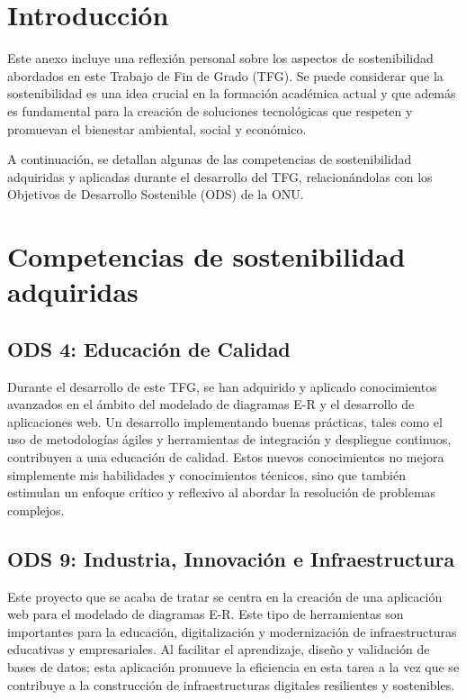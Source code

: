 
\section{Introducción}
Este anexo incluye una reflexión personal sobre los aspectos de sostenibilidad abordados en este Trabajo de Fin de Grado (TFG). Se puede considerar que la sostenibilidad es una idea crucial en la formación académica actual y que además es fundamental para la creación de soluciones tecnológicas que respeten y promuevan el bienestar ambiental, social y económico.

A continuación, se detallan algunas de las competencias de sostenibilidad adquiridas y aplicadas durante el desarrollo del TFG, relacionándolas con los Objetivos de Desarrollo Sostenible (ODS) de la ONU.

\section{Competencias de sostenibilidad adquiridas}

\subsection{ODS 4: Educación de Calidad}
Durante el desarrollo de este TFG, se han adquirido  y aplicado conocimientos avanzados en el ámbito del modelado de diagramas E-R y el desarrollo de aplicaciones web. Un desarrollo implementando buenas prácticas, tales como el uso de metodologías ágiles y herramientas de integración y despliegue continuos, contribuyen a una educación de calidad. Estos nuevos conocimientos no mejora simplemente mis habilidades y conocimientos técnicos, sino que también estimulan un enfoque crítico y reflexivo al abordar la resolución de problemas complejos.

\subsection{ODS 9: Industria, Innovación e Infraestructura}
Este proyecto que se acaba de tratar se centra en la creación de una aplicación web para el modelado de diagramas E-R. Este tipo de herramientas son importantes para la educación, digitalización y modernización de infraestructuras educativas y empresariales. Al facilitar el aprendizaje, diseño y validación de bases de datos; esta aplicación promueve la eficiencia en esta tarea a la vez que se contribuye a la construcción de infraestructuras digitales resilientes y sostenibles.

